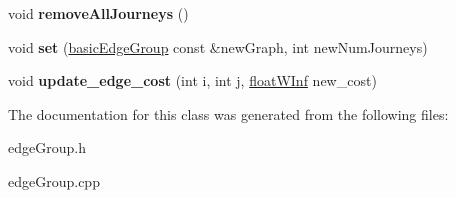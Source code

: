 \begin{DoxyCompactItemize}
\item 
\hypertarget{classedgeGroup_a3ded6f942c1659233b0fe8f314e70d08}{
void {\bfseries removeAllJourneys} ()}
\label{classedgeGroup_a3ded6f942c1659233b0fe8f314e70d08}

\item 
\hypertarget{classedgeGroup_a005001553ba389fac7873999d65a5515}{
void {\bfseries set} (\hyperlink{classbasicEdgeGroup}{basicEdgeGroup} const \&newGraph, int newNumJourneys)}
\label{classedgeGroup_a005001553ba389fac7873999d65a5515}

\item 
\hypertarget{classedgeGroup_a2eb83a6aaf3b2dd00590daa11a5a76b7}{
void {\bfseries update\_\-edge\_\-cost} (int i, int j, \hyperlink{classfloatWInf}{floatWInf} new\_\-cost)}
\label{classedgeGroup_a2eb83a6aaf3b2dd00590daa11a5a76b7}

\end{DoxyCompactItemize}


The documentation for this class was generated from the following files:\begin{DoxyCompactItemize}
\item 
edgeGroup.h\item 
edgeGroup.cpp\end{DoxyCompactItemize}

